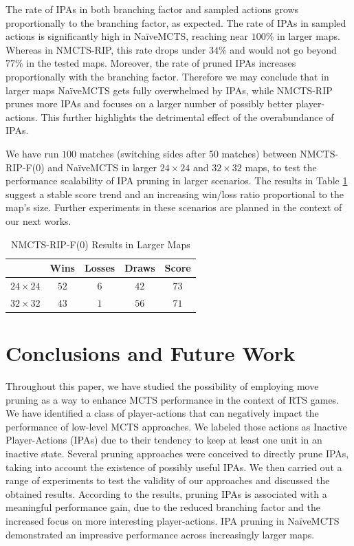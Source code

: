 \documentclass[conference]{IEEEtran}
\begin{document}
The rate of IPAs in both branching factor and sampled actions grows proportionally to the branching factor, as expected. The rate of IPAs in sampled actions is significantly high in NaïveMCTS, reaching near $100\%$ in larger maps. Whereas in NMCTS-RIP, this rate drops under $34\%$ and would not go beyond $77\%$ in the tested maps. Moreover, the rate of pruned IPAs increases proportionally with the branching factor. Therefore we may conclude that in larger maps NaïveMCTS gets fully overwhelmed by IPAs, while NMCTS-RIP prunes more IPAs and focuses on a larger number of possibly better player-actions. This further highlights the detrimental effect of the overabundance of IPAs.

We have run $100$ matches (switching sides after 50 matches) between NMCTS-RIP-F($0$) and NaïveMCTS in larger $24\times24$ and $32\times32$ maps, to test the performance scalability of IPA pruning in larger scenarios. The results in Table \ref{largeMaps} suggest a stable score trend and an increasing win/loss ratio proportional to the map's size. Further experiments in these scenarios are planned in the context of our next works.

\begin{table}[!t]
\caption{NMCTS-RIP-F($0$) Results in Larger Maps}
\label{largeMaps}
\renewcommand{\arraystretch}{1.3}
\centering
\begin{tabular}{c|c|c|c|c} 
\cline{2-5}
\multicolumn{1}{c|}{} & Wins & Losses & Draws & Score  \\ 
\hline \hline
$24\times24$ & $52$ & $6$ & $42$ & $73$ \\
$32\times32$ & $43$ & $1$ & $56$ & $71$ \\
\hline
\end{tabular}
\end{table}


\section{Conclusions and Future Work}
\label{sec:conclusions}

Throughout this paper, we have studied the possibility of employing move pruning as a way to enhance MCTS performance in the context of RTS games. We have identified a class of player-actions that can negatively impact the performance of low-level MCTS approaches. We labeled those actions as Inactive Player-Actions (IPAs) due to their tendency to keep at least one unit in an inactive state. Several pruning approaches were conceived to directly prune IPAs, taking into account the existence of possibly useful IPAs. We then carried out a range of experiments to test the validity of our approaches and discussed the obtained results. According to the results, pruning IPAs is associated with a meaningful performance gain, due to the reduced branching factor and the increased focus on more interesting player-actions. IPA pruning in NaïveMCTS demonstrated an impressive performance across increasingly larger maps.
\end{document}
